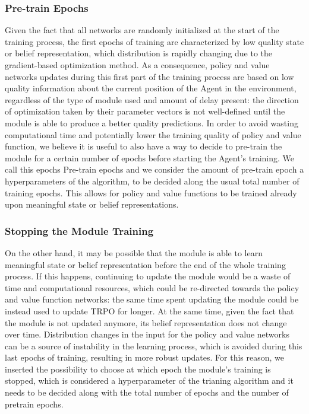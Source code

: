             \subsubsection{Pre-train Epochs}
                Given the fact that all networks are randomly initialized at the start of the training process, the first epochs of training are characterized by low quality state or belief representation, which distribution is rapidly changing due to the gradient-based optimization method. As a consequence, policy and value networks updates during this first part of the training process are based on low quality information about the current position of the Agent in the environment, regardless of the type of module used and amount of delay present: the direction of optimization taken by their parameter vectors is not well-defined until the module is able to produce a better quality predictions. \newline
                In order to avoid wasting computational time and potentially lower the training quality of policy and value function, we believe it is useful to also have a way to decide to pre-train the module for a certain number of epochs before starting the Agent's training. We call this epochs Pre-train epochs and we consider the amount of pre-train epoch a hyperparameters of the algorithm, to be decided along the usual total number of training epochs. This allows for policy and value functions to be trained already upon meaningful state or belief representations.
                
            \subsubsection{Stopping the Module Training}
                On the other hand, it may be possible that the module is able to learn meaningful state or belief representation before the end of the whole training process. If this happens, continuing to update the module would be a waste of time and computational resources, which could be re-directed towards the policy and value function networks: the same time spent updating the module could be instead used to update TRPO for longer. At the same time, given the fact that the module is not updated anymore, its belief representation does not change over time. Distribution changes in the input for the policy and value networks can be a source of instability in the learning process, which is avoided during this last epochs of training, resulting in more robust updates. \newline
                For this reason, we inserted the possibility to choose at which epoch the module's training is stopped, which is considered a hyperparameter of the trianing algorithm and it needs to be decided along with the total number of epochs and the number of pretrain epochs.
                
